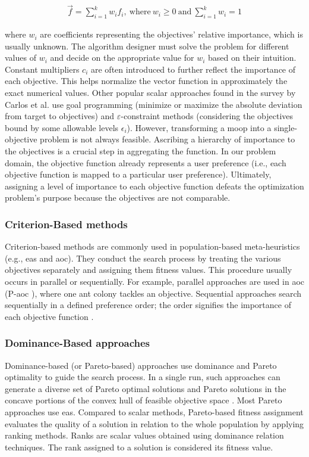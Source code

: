 \begin{gather*}
   \Vec{f} = \sum_{i=1}^k w_i f_i, \ \text{where}\ w_i \geq 0\ \text{and}\ \sum_{i=1}^k w_i = 1
\end{gather*}

where $w_i$ are coefficients representing the objectives’ relative importance, which is usually unknown. The algorithm designer must solve the problem for different values of $w_i$ and decide on the appropriate value for $w_i$ based on their intuition. Constant multipliers $c_i$ are often introduced to further reflect the importance of each objective. This helps normalize the vector function in approximately the exact numerical values. Other popular scalar approaches found in the survey by Carlos et al. \parencite{CoelloCoello1999ATechniquesc} use goal programming (minimize or maximize the absolute deviation from target to objectives) and $\varepsilon$-constraint methods (considering the objectives bound by some allowable levels $\epsilon_i$). However, transforming a \gls{moop} into a single-objective problem is not always feasible. Ascribing a hierarchy of importance to the objectives is a crucial step in aggregating the function. In our problem domain, the objective function already represents a user preference (i.e., each objective function is mapped to a particular user preference). Ultimately, assigning a level of importance to each objective function defeats the optimization problem’s purpose because the objectives are not comparable.

\subsubsection{Criterion-Based methods}
Criterion-based methods are commonly used in population-based meta-heuristics (e.g., \glspl{ea} and \gls{aoc}). They conduct the search process by treating the various objectives separately and assigning them fitness values. This procedure usually occurs in parallel or sequentially. For example, parallel approaches are used in \gls{aoc} (P-\gls{aoc} \parencite{Doerner2004ParetoSelection}), where one ant colony tackles an objective. Sequential approaches search sequentially in a defined preference order; the order signifies the importance of each objective function \parencite{Fishburn1974ExceptionalSurvey}.

\subsubsection{Dominance-Based approaches}
Dominance-based (or Pareto-based) approaches use dominance and Pareto optimality to guide the search process. In a single run, such approaches can generate a diverse set of Pareto optimal solutions and Pareto solutions in the concave portions of the convex hull of feasible objective space \parencite{Talbi2009Metaheuristics:Implementation}. Most Pareto approaches use \glspl{ea}. Compared to scalar methods, Pareto-based fitness assignment evaluates the quality of a solution in relation to the whole population by applying ranking methods. Ranks are scalar values obtained using dominance relation techniques. The rank assigned to a solution is considered its fitness value.

